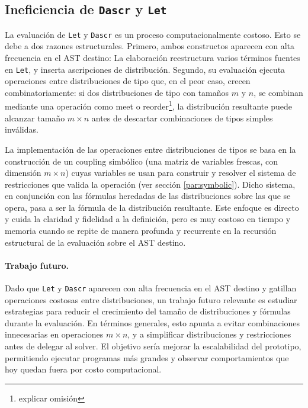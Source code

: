 \subsection{Ineficiencia de \lstinline|Dascr| y \lstinline|Let|}\label{subsec:lim-eficiencia}

La evaluación de \lstinline|Let| y
\lstinline|Dascr| es un proceso computacionalmente
costoso.  Esto se debe a dos razones
estructurales. Primero, ambos constructos aparecen
con alta frecuencia en el AST destino: La
elaboración reestructura varios términos fuentes
en \verb|Let|, y inserta ascripciones de distribución.  Segundo, su evaluación ejecuta
operaciones entre distribuciones de tipo que, en
el peor caso, crecen combinatoriamente: si dos
distribuciones de tipo con tamaños $m$
y $n$, se combinan mediante una operación como
meet o reorder\footnote{explicar omisión}, la distribución resultante puede
alcanzar tamaño $m \times n$ antes de descartar
combinaciones de tipos simples inválidas.

La implementación de las operaciones entre
distribuciones de tipos se basa en la construcción
de un coupling simbólico (una matriz de variables
frescas, con dimensión $m\times n$) cuyas variables
se usan para construir y resolver el sistema de
restricciones que valida la operación (ver sección
\ref{par:symbolic}). Dicho sistema, en conjunción
con las fórmulas heredadas de las distribuciones
sobre las que se opera, pasa a ser la fórmula de la
distribución resultante.  Este enfoque es
directo y cuida la claridad y fidelidad a la
definición, pero es muy costoso en tiempo y
memoria cuando se repite de manera profunda y
recurrente en la recursión estructural de la
evaluación sobre el AST destino.

\paragraph{Trabajo futuro.}
Dado que \lstinline|Let| y \lstinline|Dascr| aparecen con alta
frecuencia en el AST destino y gatillan operaciones costosas entre
distribuciones, un trabajo futuro relevante es estudiar estrategias
para reducir el crecimiento del tamaño de distribuciones y fórmulas
durante la evaluación. En términos generales, esto apunta a evitar
combinaciones innecesarias en operaciones $m\times n$, y a simplificar
distribuciones y restricciones antes de delegar al solver. El objetivo
sería mejorar la escalabilidad del prototipo, permitiendo ejecutar
programas más grandes y observar comportamientos que hoy quedan fuera
por costo computacional.


